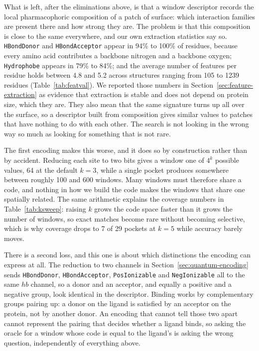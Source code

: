 What is left, after the eliminations above, is that a window descriptor records the local
pharmacophoric composition of a patch of surface: which interaction families are present
there and how strong they are. The problem is that this composition is close to the same
everywhere, and our own extraction statistics say so. \texttt{HBondDonor} and
\texttt{HBondAcceptor} appear in 94\% to 100\% of residues, because every amino acid
contributes a backbone nitrogen and a backbone oxygen; \texttt{Hydrophobe} appears in
79\% to 84\%; and the average number of features per residue holds between 4.8 and 5.2 across
structures ranging from 105 to 1239 residues (Table~\ref{tab:featval}). We reported those
numbers in Section~\ref{sec:feature-extraction} as evidence that extraction is stable and does not
depend on protein size, which they are. They also mean that the same signature turns up
all over the surface, so a descriptor built from composition gives similar values to
patches that have nothing to do with each other. The search is not looking in the wrong
way so much as looking for something that is not rare.

The first encoding makes this worse, and it does so by construction rather than by
accident. Reducing each site to two bits gives a window one of $4^k$ possible values, 64
at the default $k=3$, while a single pocket produces somewhere between roughly 100 and
600 windows. Many windows must therefore share a code, and nothing in how we build the
code makes the windows that share one spatially related. The same arithmetic explains the
coverage numbers in Table~\ref{tab:ksweep}: raising $k$ grows the code space faster than
it grows the number of windows, so exact matches become rare without becoming selective,
which is why coverage drops to 7 of 29 pockets at $k=5$ while accuracy barely moves.

There is a second loss, and this one is about which distinctions the encoding can express
at all. The reduction to two channels in Section~\ref{sec:quantum-encoding} sends
\texttt{HBondDonor}, \texttt{HBondAcceptor}, \texttt{PosIonizable} and
\texttt{NegIonizable} all to the same $hb$ channel, so a donor and an acceptor, and
equally a positive and a negative group, look identical in the descriptor. Binding works
by complementary groups pairing up: a donor on the ligand is satisfied by an acceptor on
the protein, not by another donor. An encoding that cannot tell those two apart cannot
represent the pairing that decides whether a ligand binds, so asking the oracle for a
window whose code is equal to the ligand's is asking the wrong question, independently of
everything above.

